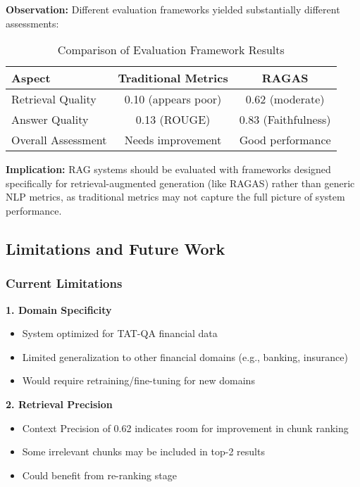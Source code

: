 \textbf{Observation:} Different evaluation frameworks yielded substantially different assessments:

\begin{table}[htbp]
\centering
\caption{Comparison of Evaluation Framework Results}
\label{tab:framework_comparison}
\begin{tabular}{lcc}
\toprule
\textbf{Aspect} & \textbf{Traditional Metrics} & \textbf{RAGAS} \\
\midrule
Retrieval Quality & 0.10 (appears poor) & 0.62 (moderate) \\
Answer Quality & 0.13 (ROUGE) & 0.83 (Faithfulness) \\
Overall Assessment & Needs improvement & Good performance \\
\bottomrule
\end{tabular}
\end{table}

\textbf{Implication:} RAG systems should be evaluated with frameworks designed specifically for retrieval-augmented generation (like RAGAS) rather than generic NLP metrics, as traditional metrics may not capture the full picture of system performance.

\subsection{Limitations and Future Work}
\label{subsec:limitations}

\subsubsection{Current Limitations}

\textbf{1. Domain Specificity}
\begin{itemize}
    \item System optimized for TAT-QA financial data
    \item Limited generalization to other financial domains (e.g., banking, insurance)
    \item Would require retraining/fine-tuning for new domains
\end{itemize}

\textbf{2. Retrieval Precision}
\begin{itemize}
    \item Context Precision of 0.62 indicates room for improvement in chunk ranking
    \item Some irrelevant chunks may be included in top-2 results
    \item Could benefit from re-ranking stage
\end{itemize}

